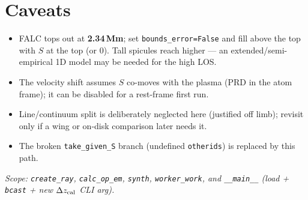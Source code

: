 \documentclass[10pt]{article}
\newcommand{\code}[1]{\texttt{\small #1}}
\begin{document}
\section{Caveats}
\begin{itemize}
  \item FALC tops out at \textbf{2.34\,Mm}; set \code{bounds\_error=False} and fill
    above the top with $S$ at the top (or 0). Tall spicules reach higher --- an
    extended/semi-empirical 1D model may be needed for the high LOS.
  \item The velocity shift assumes $S$ co-moves with the plasma (PRD in the atom
    frame); it can be disabled for a rest-frame first run.
  \item Line/continuum split is deliberately neglected here (justified off limb);
    revisit only if a wing or on-disk comparison later needs it.
  \item The broken \code{take\_given\_S} branch (undefined \code{otherids}) is
    replaced by this path.
\end{itemize}

\begin{center}\small\itshape
Scope: \code{create\_ray}, \code{calc\_op\_em}, \code{synth}, \code{worker\_work},
and \code{\_\_main\_\_} (load + \code{bcast} + new $\Delta z_{\rm cal}$ CLI arg).
\end{center}
\end{document}
